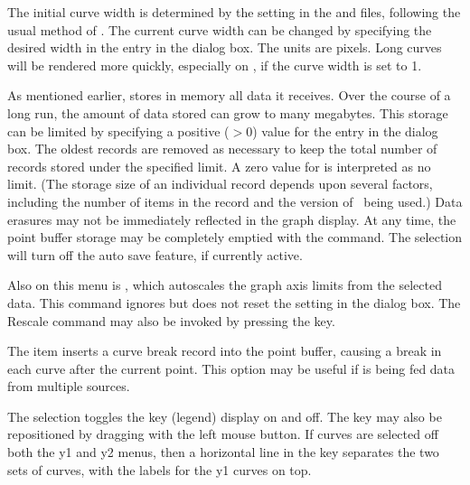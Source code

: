 The initial curve width is determined by the  setting in the  and
 files, following the usual method of
.  The current curve
width can be changed by specifying the desired width in the  entry in the {} dialog box.
The units are pixels.  Long curves will be rendered more quickly,
especially on \Windows, if the curve width is set to 1.

As mentioned earlier,  stores in memory all data it
receives.  Over the course of a long run, the amount of data stored can
grow to many megabytes.  This storage can be limited
by specifying a positive ($>0$) value for the 
entry in the {} dialog box.  The oldest
records are removed as necessary to keep the total number of records
stored under the specified limit.  A zero value for  is interpreted as no limit.  (The storage size of an individual
record depends upon several factors, including the number of items in
the record and the version of \Tcl\ being used.)  Data erasures may not
be immediately reflected in the graph display.  At any time, the point
buffer storage may be completely emptied with the  command.  The  selection
will turn off the auto save feature, if currently active.

Also on this menu is , which autoscales the
graph axis limits from the selected data.  This command ignores but does
not reset the  setting in the  dialog box.  The Rescale command may also be invoked by
pressing the  key.

The  item inserts a curve break record
into the point buffer, causing a break in each curve after the current
point.  This option may be useful if  is being fed data
from multiple sources.

The  selection toggles the key (legend) display on
and off.  The key may also be repositioned by dragging with the left
mouse button.  If curves are selected off both the y1 and y2 menus, then
a horizontal line in the key separates the two sets of curves, with the
labels for the y1 curves on top.

